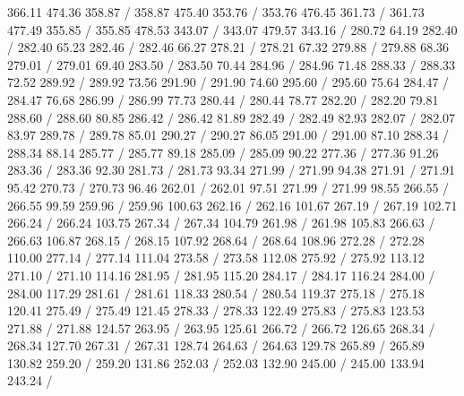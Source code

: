 { 366.11 474.36 358.87 /
 358.87 475.40 353.76 /
 353.76 476.45 361.73 /
 361.73 477.49 355.85 /
 355.85 478.53 343.07 /
 343.07 479.57 343.16 /
\setsolid
{} 280.72 64.19 282.40 /
 282.40 65.23 282.46 /
 282.46 66.27 278.21 /
 278.21 67.32 279.88 /
 279.88 68.36 279.01 /
 279.01 69.40 283.50 /
 283.50 70.44 284.96 /
 284.96 71.48 288.33 /
 288.33 72.52 289.92 /
 289.92 73.56 291.90 /
 291.90 74.60 295.60 /
 295.60 75.64 284.47 /
 284.47 76.68 286.99 /
 286.99 77.73 280.44 /
 280.44 78.77 282.20 /
 282.20 79.81 288.60 /
 288.60 80.85 286.42 /
 286.42 81.89 282.49 /
 282.49 82.93 282.07 /
 282.07 83.97 289.78 /
 289.78 85.01 290.27 /
 290.27 86.05 291.00 /
 291.00 87.10 288.34 /
 288.34 88.14 285.77 /
 285.77 89.18 285.09 /
 285.09 90.22 277.36 /
 277.36 91.26 283.36 /
 283.36 92.30 281.73 /
 281.73 93.34 271.99 /
 271.99 94.38 271.91 /
 271.91 95.42 270.73 /
 270.73 96.46 262.01 /
 262.01 97.51 271.99 /
 271.99 98.55 266.55 /
 266.55 99.59 259.96 /
 259.96 100.63 262.16 /
 262.16 101.67 267.19 /
 267.19 102.71 266.24 /
 266.24 103.75 267.34 /
 267.34 104.79 261.98 /
 261.98 105.83 266.63 /
 266.63 106.87 268.15 /
 268.15 107.92 268.64 /
 268.64 108.96 272.28 /
 272.28 110.00 277.14 /
 277.14 111.04 273.58 /
 273.58 112.08 275.92 /
 275.92 113.12 271.10 /
 271.10 114.16 281.95 /
 281.95 115.20 284.17 /
 284.17 116.24 284.00 /
 284.00 117.29 281.61 /
 281.61 118.33 280.54 /
 280.54 119.37 275.18 /
 275.18 120.41 275.49 /
 275.49 121.45 278.33 /
 278.33 122.49 275.83 /
 275.83 123.53 271.88 /
 271.88 124.57 263.95 /
 263.95 125.61 266.72 /
 266.72 126.65 268.34 /
 268.34 127.70 267.31 /
 267.31 128.74 264.63 /
 264.63 129.78 265.89 /
 265.89 130.82 259.20 /
 259.20 131.86 252.03 /
 252.03 132.90 245.00 /
 245.00 133.94 243.24 /
}
